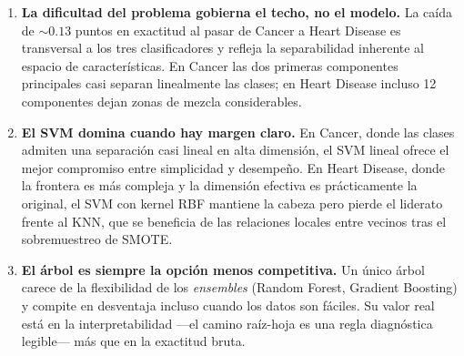 \begin{enumerate}
    \item \textbf{La dificultad del problema gobierna el techo, no el modelo.}
          La caída de $\sim 0.13$ puntos en exactitud al pasar de Cancer a
          Heart Disease es transversal a los tres clasificadores y refleja
          la separabilidad inherente al espacio de características. En
          Cancer las dos primeras componentes principales casi separan
          linealmente las clases; en Heart Disease incluso 12 componentes
          dejan zonas de mezcla considerables.

    \item \textbf{El SVM domina cuando hay margen claro.} En Cancer, donde
          las clases admiten una separación casi lineal en alta dimensión,
          el SVM lineal ofrece el mejor compromiso entre simplicidad y
          desempeño. En Heart Disease, donde la frontera es más compleja y
          la dimensión efectiva es prácticamente la original, el SVM con
          kernel RBF mantiene la cabeza pero pierde el liderato frente al
          KNN, que se beneficia de las relaciones locales entre vecinos
          tras el sobremuestreo de SMOTE.

    \item \textbf{El árbol es siempre la opción menos competitiva.} Un único
          árbol carece de la flexibilidad de los \textit{ensembles}
          (Random Forest, Gradient Boosting) y compite en desventaja
          incluso cuando los datos son fáciles. Su valor real está en la
          interpretabilidad ---el camino raíz-hoja es una regla diagnóstica
          legible--- más que en la exactitud bruta.
\end{enumerate}
